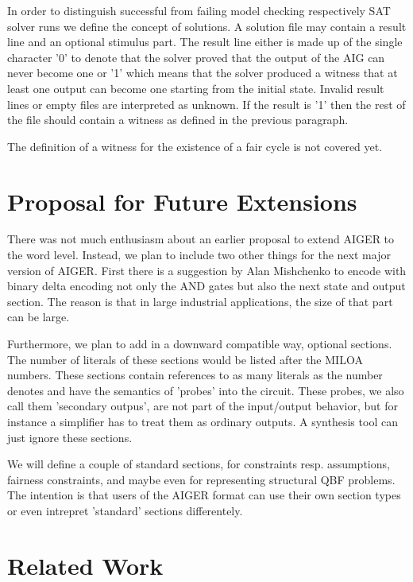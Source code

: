\documentclass[10pt]{llncs}
\begin{document}
  In order to distinguish successful from failing model checking
  respectively SAT solver runs we define the concept of solutions.  A
  solution file may contain a result line and an optional stimulus part.
  The result line either is made up of the single character '0' to denote
  that the solver proved that the output of the AIG can never become one or
  '1' which means that the solver produced a witness that at least one
  output can become one starting from the initial state.  Invalid result
  lines or empty files are interpreted as unknown.  If the result is '1'
  then the rest of the file should contain a witness as defined in the
  previous paragraph.

  The definition of a witness for the existence of a fair cycle is not
  covered yet.

\section{Proposal for Future Extensions}

  There was not much enthusiasm about an earlier proposal to extend AIGER to
  the word level.  Instead, we plan to include two other things for the next
  major version of AIGER.  First there is a suggestion by Alan Mishchenko to
  encode with binary delta encoding not only the AND gates but also the next
  state and output section.  The reason is that in large industrial
  applications, the size of that part can be large.
  
  Furthermore, we plan to add in a downward compatible way, optional
  sections.  The number of literals of these sections would be listed after
  the MILOA numbers.  These sections contain references to as many literals
  as the number denotes and have the semantics of 'probes' into the circuit.
  These probes, we also call them 'secondary outpus', are not part of the
  input/output behavior, but for instance a simplifier has to treat them as
  ordinary outputs.  A synthesis tool can just ignore these sections.
  
  We will define a couple of standard sections, for constraints resp.
  assumptions, fairness constraints, and maybe even for representing
  structural QBF problems.  The intention is that users of the AIGER format
  can use their own section types or even intrepret 'standard' sections
  differentely.
  
\section{Related Work}
\end{document}
